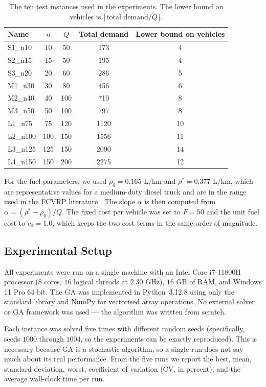 \documentclass [a4paper, 11pt, titlepage] {article}
\begin{document}
\begin{table}[H]
\centering
\small
\begin{tabular}{|l|c|c|c|c|}
\hline
\textbf{Name} & \textbf{$n$} & \textbf{$Q$} & \textbf{Total demand} & \textbf{Lower bound on vehicles} \\
\hline
S1\_n10  &  10 &  50 &  173 & 4 \\
S2\_n15  &  15 &  50 &  195 & 4 \\
S3\_n20  &  20 &  60 &  286 & 5 \\
M1\_n30  &  30 &  80 &  456 & 6 \\
M2\_n40  &  40 & 100 &  710 & 8 \\
M3\_n50  &  50 & 100 &  797 & 8 \\
L1\_n75  &  75 & 120 & 1120 & 10 \\
L2\_n100 & 100 & 150 & 1556 & 11 \\
L3\_n125 & 125 & 150 & 2090 & 14 \\
L4\_n150 & 150 & 200 & 2275 & 12 \\
\hline
\end{tabular}
\caption{The ten test instances used in the experiments. The lower bound on vehicles is $\lceil \text{total demand}/Q \rceil$.}
\label{tab:instances}
\end{table}

For the fuel parameters, we used $\rho_0 = 0.165$ L/km and $\rho^* = 0.377$ L/km, which are representative values for a medium-duty diesel truck and are in the range used in the FCVRP literature \cite{xiao2012}. The slope $\alpha$ is then computed from $\alpha = (\rho^* - \rho_0)/Q$. The fixed cost per vehicle was set to $F = 50$ and the unit fuel cost to $c_0 = 1.0$, which keeps the two cost terms in the same order of magnitude.

\subsection{Experimental Setup}
\label{sec:setup}

All experiments were run on a single machine with an Intel Core i7-11800H processor ($8$ cores, $16$ logical threads at $2.30$ GHz), $16$ GB of RAM, and Windows 11 Pro 64-bit. The GA was implemented in Python~3.12.8 using only the standard library and NumPy for vectorised array operations. No external solver or GA framework was used --- the algorithm was written from scratch.

Each instance was solved five times with different random seeds (specifically, seeds $1000$ through $1004$, so the experiments can be exactly reproduced). This is necessary because GA is a stochastic algorithm, so a single run does not say much about its real performance. From the five runs we report the best, mean, standard deviation, worst, coefficient of variation (CV, in percent), and the average wall-clock time per run.
\end{document}
